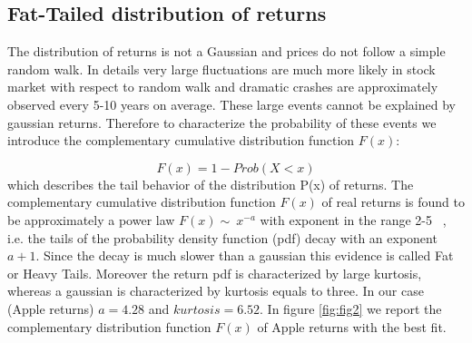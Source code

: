 \documentclass[letterpaper,12pt]{article}
\begin{document}
\subsection{Fat-Tailed distribution of returns}

The distribution of returns is not a Gaussian and prices do not follow a simple random walk. In details very large fluctuations are much more likely in stock market with respect to random walk and dramatic crashes are approximately observed every 5-10 years on average. These large events cannot be explained by gaussian returns. Therefore to characterize the probability of these events we introduce the complementary cumulative distribution function $F(x)$: 

\[ F(x) = 1 - Prob(X < x) \]
which describes the tail behavior of the distribution P(x) of returns. The complementary cumulative distribution function $F(x)$ of real returns is found to be approximately a power law $F(x) \sim\  x^{-a}$ with exponent in the range 2-5 ~\cite{Rama}, i.e. the tails of the probability density function (pdf) decay with an exponent $a + 1$. Since the decay is much slower than a gaussian this evidence is called Fat or Heavy Tails. Moreover the return pdf is characterized by large kurtosis, whereas a gaussian is characterized by kurtosis equals to three. In our case (Apple returns) $a = 4.28$ and $kurtosis = 6.52$. In figure \ref{fig:fig2} we report the complementary distribution function $F(x)$ of Apple returns with the best fit.
\end{document}
